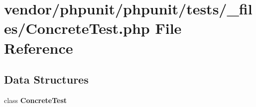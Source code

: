 \section{vendor/phpunit/phpunit/tests/\+\_\+files/\+Concrete\+Test.php File Reference}
\label{_concrete_test_8php}
\subsection*{Data Structures}
\begin{DoxyCompactItemize}
\item 
class {\bf Concrete\+Test}
\end{DoxyCompactItemize}

